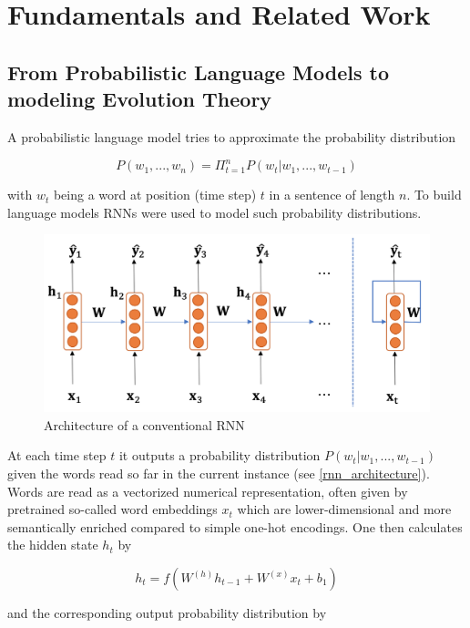 \section{Fundamentals and Related Work} \label{fundamentals}

\subsection{From Probabilistic Language Models to modeling Evolution Theory} \label{fundamentalsB}

A probabilistic language model tries to approximate the probability dis\-tri\-bu\-ti\-on 

\begin{equation}
	P(w_1, ..., w_n) = \Pi_{t=1}^{n} P(w_t | w_1, ..., w_{t-1})
\end{equation}

with $w_t$ being a word at position (time step) $t$ in a sentence of length $n$. To build language models \acp{RNN} were used to model such probability distributions. 

\begin{figure}[ht]
	\centering
	\includegraphics[width=0.6\linewidth]{figures/rnn_architecture.png}
	\caption{Architecture of a conventional \ac{RNN} \cite[p. 46]{Gertz2020}}
	\label{rnn_architecture}
\end{figure}

At each time step $t$ it outputs a probability distribution $P(w_t | w_1, ..., w_{t-1})$ given the words read so far in the current instance (see \autoref{rnn_architecture}). Words are read as a vectorized numerical representation, often given by pretrained so-called word embeddings $x_t$ which are lower-dimensional and more semantically enriched compared to simple one-hot encodings. One then calculates the hidden state $h_t$ by

\begin{equation}
	h_t = f(W^{(h)} h_{t-1} + W^{(x)} x_t + b_1)
\end{equation}

and the corresponding output probability distribution by 

